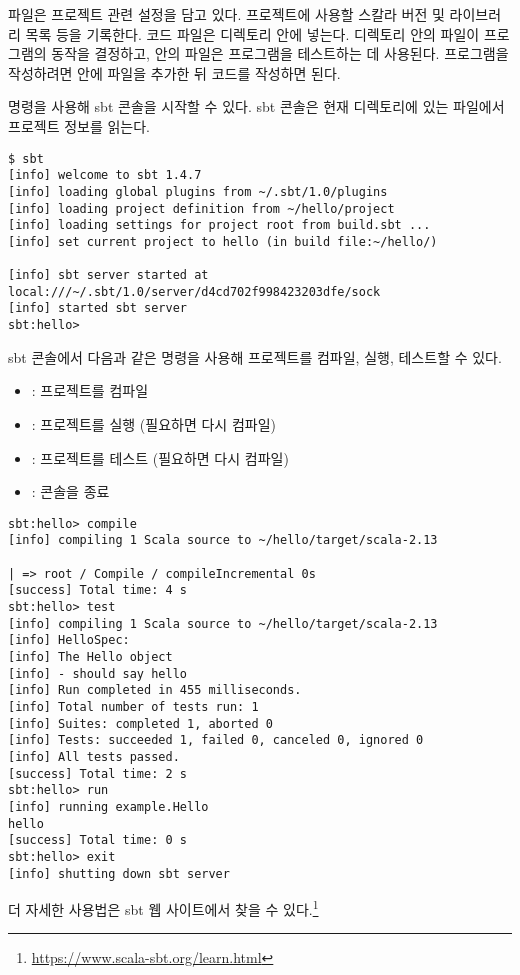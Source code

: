  파일은 프로젝트 관련 설정을 담고 있다. 프로젝트에 사용할 스칼라 버전
및 라이브러리 목록 등을 기록한다. 코드 파일은  디렉토리 안에 넣는다.
디렉토리 안의 파일이 프로그램의 동작을 결정하고,  안의 파일은 프로그램을
테스트하는 데 사용된다. 프로그램을 작성하려면  안에 파일을 추가한
뒤 코드를 작성하면 된다.

 명령을 사용해 sbt 콘솔을 시작할 수 있다. sbt 콘솔은 현재 디렉토리에
있는  파일에서 프로젝트 정보를 읽는다.

\begin{verbatim}
$ sbt
[info] welcome to sbt 1.4.7
[info] loading global plugins from ~/.sbt/1.0/plugins
[info] loading project definition from ~/hello/project
[info] loading settings for project root from build.sbt ...
[info] set current project to hello (in build file:~/hello/)

[info] sbt server started at
local:///~/.sbt/1.0/server/d4cd702f998423203dfe/sock
[info] started sbt server
sbt:hello>
\end{verbatim}

sbt 콘솔에서 다음과 같은 명령을 사용해 프로젝트를 컴파일, 실행, 테스트할 수
있다.

\begin{itemize}
  \item {}: 프로젝트를 컴파일
  \item {}: 프로젝트를 실행 (필요하면 다시 컴파일)
  \item {}: 프로젝트를 테스트 (필요하면 다시 컴파일)
  \item {}: 콘솔을 종료
\end{itemize}

\begin{verbatim}
sbt:hello> compile
[info] compiling 1 Scala source to ~/hello/target/scala-2.13

| => root / Compile / compileIncremental 0s
[success] Total time: 4 s
sbt:hello> test
[info] compiling 1 Scala source to ~/hello/target/scala-2.13
[info] HelloSpec:
[info] The Hello object
[info] - should say hello
[info] Run completed in 455 milliseconds.
[info] Total number of tests run: 1
[info] Suites: completed 1, aborted 0
[info] Tests: succeeded 1, failed 0, canceled 0, ignored 0
[info] All tests passed.
[success] Total time: 2 s
sbt:hello> run
[info] running example.Hello
hello
[success] Total time: 0 s
sbt:hello> exit
[info] shutting down sbt server
\end{verbatim}

더 자세한 사용법은 sbt 웹 사이트에서 찾을 수 있다.\footnote{\url{https://www.scala-sbt.org/learn.html}}
